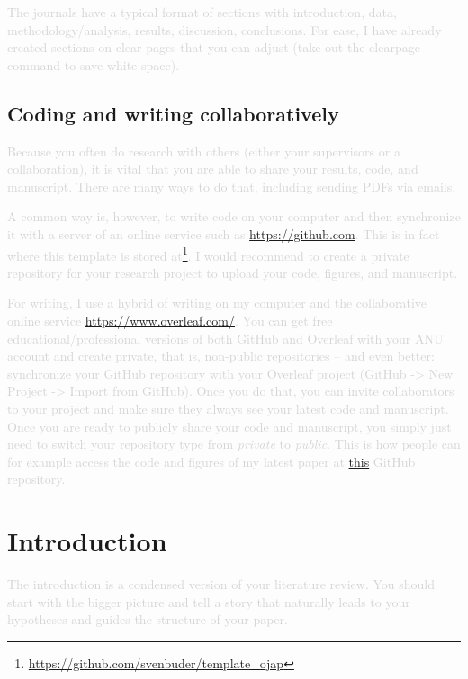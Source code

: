 \documentclass[fleqn,usenatbib]{mnras}
\newcommand{\comment}[1]{\textcolor{lightgray}{#1}}
\begin{document}
\comment{The journals have a typical format of sections with introduction, data, methodology/analysis, results, discussion, conclusions. For ease, I have already created sections on clear pages that you can adjust (take out the clearpage command to save white space).}

\subsection{Coding and writing collaboratively}

\comment{Because you often do research with others (either your supervisors or a collaboration), it is vital that you are able to share your results, code, and manuscript. There are many ways to do that, including sending PDFs via emails.}

\comment{A common way is, however, to write code on your computer and then synchronize it with a server of an online service such as \url{https://github.com}. This is in fact where this template is stored at\footnote{\url{https://github.com/svenbuder/template_ojap}}. I would recommend to create a private repository for your research project to upload your code, figures, and manuscript.}

\comment{For writing, I use a hybrid of writing on my computer and the collaborative online service \url{https://www.overleaf.com/}. You can get free educational/professional versions of both GitHub and Overleaf with your ANU account and create private, that is, non-public repositories -- and even better: synchronize your GitHub repository with your Overleaf project (GitHub -> New Project -> Import from GitHub). Once you do that, you can invite collaborators to your project and make sure they always see your latest code and manuscript. Once you are ready to publicly share your code and manuscript, you simply just need to switch your repository type from \textit{private} to \textit{public}. This is how people can for example access the code and figures of my latest paper \citep{Buder2024} at \href{https://github.com/svenbuder/Accretion_Clues_ObsSim}{this} GitHub repository.}

\clearpage
\section{Introduction}
\label{sec:introduction}

\comment{The introduction is a condensed version of your literature review. You should start with the bigger picture and tell a story that naturally leads to your hypotheses and guides the structure of your paper.}
\end{document}
